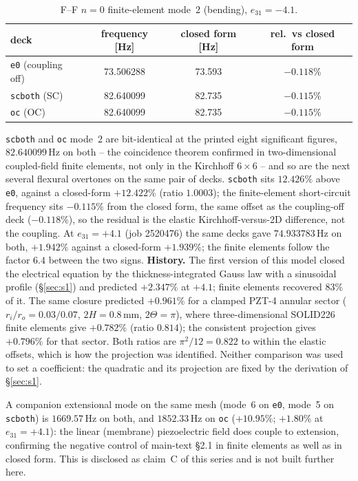 \documentclass[11pt]{article}
\begin{document}
\begin{table}[ht]
\centering
\caption{F--F $n=0$ finite-element mode~2 (bending), $e_{31}=-4.1$.}
\label{tab:fe}
\small
\begin{tabular}{@{}lccc@{}}
\toprule
deck & frequency [Hz] & closed form [Hz] & rel.\ vs closed form \\
\midrule
\texttt{e0} (coupling off) & 73.506288 & 73.593 & $-0.118\%$ \\
\texttt{scboth} (SC) & 82.640099 & 82.735 & $-0.115\%$ \\
\texttt{oc} (OC) & 82.640099 & 82.735 & $-0.115\%$ \\
\bottomrule
\end{tabular}
\end{table}

\texttt{scboth} and \texttt{oc} mode~2 are bit-identical at the printed
eight significant figures, $82.640099\,\mathrm{Hz}$ on both -- the
coincidence theorem confirmed in two-dimensional coupled-field finite
elements, not only in the Kirchhoff $6\times6$ -- and so are the next
several flexural overtones on the same pair of decks. \texttt{scboth}
sits $12.426\%$ above \texttt{e0}, against a closed-form $+12.422\%$
(ratio $1.0003$); the finite-element short-circuit frequency sits
$-0.115\%$ from the closed form, the same offset as the coupling-off
deck ($-0.118\%$), so the residual is the elastic Kirchhoff-versus-2D
difference, not the coupling. At $e_{31}=+4.1$ (job 2520476) the same
decks gave $74.933783\,\mathrm{Hz}$ on both, $+1.942\%$ against a
closed-form $+1.939\%$; the finite elements follow the factor
$6.4$ between the two signs. \textbf{History.} The first version of
this model closed the electrical equation by the thickness-integrated
Gauss law with a sinusoidal profile (\S\ref{sec:s1}) and predicted
$+2.347\%$ at $+4.1$; finite elements recovered $83\%$ of it. The same
closure predicted $+0.961\%$ for a clamped PZT-4 annular sector
($r_i/r_o=0.03/0.07$, $2H=0.8\,\mathrm{mm}$, $2\Theta=\pi$), where
three-dimensional SOLID226 finite elements give $+0.782\%$ (ratio
$0.814$); the consistent projection gives $+0.796\%$ for that sector.
Both ratios are $\pi^2/12=0.822$ to within the elastic offsets, which is
how the projection was identified. Neither comparison was used to set a
coefficient: the quadratic and its projection are fixed by the
derivation of \S\ref{sec:s1}.

A companion extensional mode on the same mesh (mode~6 on \texttt{e0},
mode~5 on \texttt{scboth}) is $1669.57\,\mathrm{Hz}$ on both, and
$1852.33\,\mathrm{Hz}$ on \texttt{oc} ($+10.95\%$; $+1.80\%$ at
$e_{31}=+4.1$): the linear
(membrane) piezoelectric field does couple to extension, confirming
the negative control of main-text \S2.1 in finite elements as well as
in closed form. This is disclosed as claim~C of this series
\cite{mccune2026piezo} and is not built further here.
\end{document}
